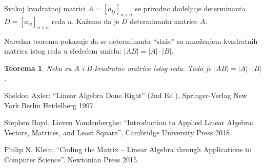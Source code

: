 \documentclass[11pt]{article}
\theoremstyle{masulthm}
\newtheorem{theorem}{Teorema}[section]
\theoremstyle{masuldef}
\theoremstyle{masulexmp}
\begin{document}
Svakoj kvadratnoj matrici $ A = [a_{ij}]_{n \times n} $ se prirodno dodeljuje determinanta
$ D = [a_{ij}]_{n \times n} $ reda $ n $. Kažemo da je $ D $ determinanta matrice $ A $.

Naredna teorema pokazuje da se determinanta ``slaže'' sa množenjem kvadratnih matrica istog reda
u sledećem smislu: $ |AB| = |A| \cdot |B| $.

\begin{theorem}
  Neka su $ A $ i $ B $ kvadratne matrice istog reda. Tada je $ |AB| = |A| \cdot |B| $.
\end{theorem}

\begin{thebibliography}{9}
Sheldon Axler: ``Linear Algebra Done Right'' (2nd Ed.), Springer-Verlag New York Berlin Heidelberg 1997.

Stephen Boyd, Lieven Vandenberghe: ``Introduction to Applied Linear Algebra: Vectors, Matrices, and Least Square'',
Cambridge University Press 2018.

Philip N. Klein: ``Coding the Matrix -- Linear Algebra through Applications to Computer Science''.
Newtonian Press 2015.

\end{thebibliography}
\end{document}
